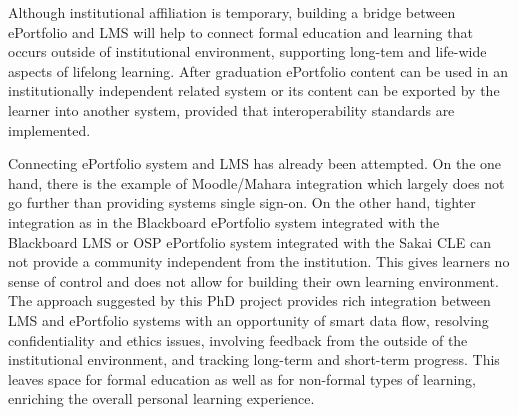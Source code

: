 Although institutional affiliation is temporary, building a bridge between ePortfolio and
LMS will help to connect formal education and learning that occurs outside of
institutional environment, supporting long-tem and life-wide aspects of lifelong learning.
After graduation ePortfolio content can be used in an institutionally independent related
system or its content can be exported by the learner into another system, provided that
interoperability standards are implemented.

Connecting ePortfolio system and LMS has already been attempted. On the one hand,
there is the example of Moodle/Mahara integration which largely does not go further than
providing systems single sign-on. On the other hand, tighter integration as in the
Blackboard ePortfolio system integrated with the Blackboard LMS or OSP ePortfolio
system integrated with the Sakai CLE can not provide a community independent from the
institution. This gives learners no sense of control and does not allow for building their
own learning environment. The approach suggested by this PhD project provides rich
integration between LMS and ePortfolio systems with an opportunity of smart data flow,
resolving confidentiality and ethics issues, involving feedback from the outside of the
institutional environment, and tracking long-term and short-term progress. This leaves
space for formal education as well as for non-formal types of learning, enriching the
overall personal learning experience.

